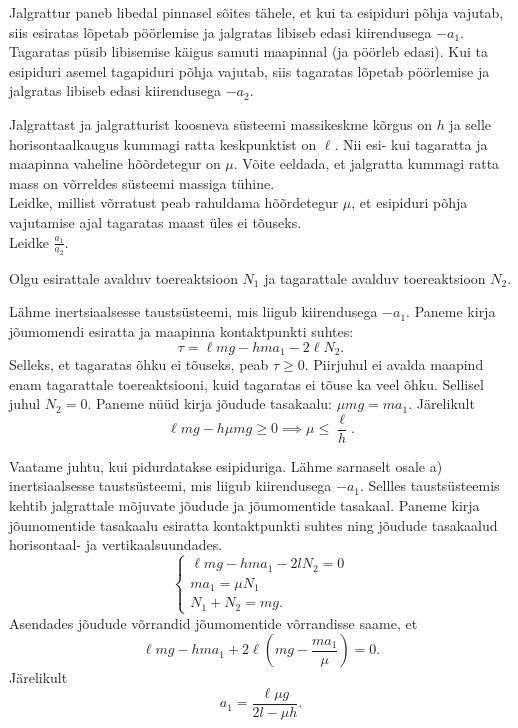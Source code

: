 
Jalgrattur paneb libedal pinnasel sõites tähele, et kui ta esipiduri põhja vajutab, siis esiratas lõpetab pöörlemise ja jalgratas libiseb edasi kiirendusega $-a_1$. Tagaratas püsib libisemise käigus samuti maapinnal (ja pöörleb edasi). Kui ta esipiduri asemel tagapiduri põhja vajutab, siis tagaratas lõpetab pöörlemise ja jalgratas libiseb edasi kiirendusega $-a_2$.

Jalgrattast ja jalgratturist koosneva süsteemi massikeskme kõrgus on $h$ ja selle horisontaalkaugus kummagi ratta keskpunktist on $\ell$. Nii esi- kui tagaratta ja maapinna vaheline hõõrdetegur on $\mu$. Võite eeldada, et jalgratta kummagi ratta mass on võrreldes süsteemi massiga tühine.\\
\osa Leidke, millist võrratust peab rahuldama hõõrdetegur $\mu$, et esipiduri põhja vajutamise ajal tagaratas maast üles ei tõuseks.\\
\osa Leidke $\frac{a_1}{a_2}$.


\hint

\solu
Olgu esirattale avalduv toereaktsioon $N_1$ ja tagarattale avalduv toereaktsioon $N_2$.

\osa Lähme inertsiaalsesse taustsüsteemi, mis liigub kiirendusega $-a_1$. Paneme kirja jõumomendi esiratta ja maapinna kontaktpunkti suhtes:
\begin{equation}
  \tau=\ell mg-h m a_1 - 2\ell N_2.
\end{equation}
Selleks, et tagaratas õhku ei tõuseks, peab $\tau \geq 0$. Piirjuhul ei avalda maapind enam tagarattale toereaktsiooni, kuid tagaratas ei tõuse ka veel õhku. Sellisel juhul $N_2=0$. Paneme nüüd kirja jõudude tasakaalu: $\mu mg = m a_1$. Järelikult
\begin{equation}
\ell mg-h \mu mg \geq 0 \implies \mu \leq \frac{\ell}{h}.
\end{equation}

\osa Vaatame juhtu, kui pidurdatakse esipiduriga. Lähme sarnaselt osale a) inertsiaalsesse taustsüsteemi, mis liigub kiirendusega $-a_1$.  Sellles taustsüsteemis kehtib jalgrattale mõjuvate jõudude ja jõumomentide tasakaal. Paneme kirja jõumomentide tasakaalu esiratta kontaktpunkti suhtes ning jõudude tasakaalud horisontaal- ja vertikaalsuundades.
\begin{equation}
\begin{cases}
  \ell m g - h m a_1  - 2l N_2 =0 \\
  m a_1 = \mu N_1\\
  N_1 + N_2 = mg.
\end{cases}
\end{equation}
Asendades jõudude võrrandid jõumomentide võrrandisse saame, et
\begin{equation}
\ell m g -h m a_1 + 2 \ell \left( mg - \frac{m a_1}{\mu }\right) = 0.
\end{equation}
Järelikult
\begin{equation}
a_1=\frac{\ell \mu g}{2l - \mu h}.
\end{equation}


